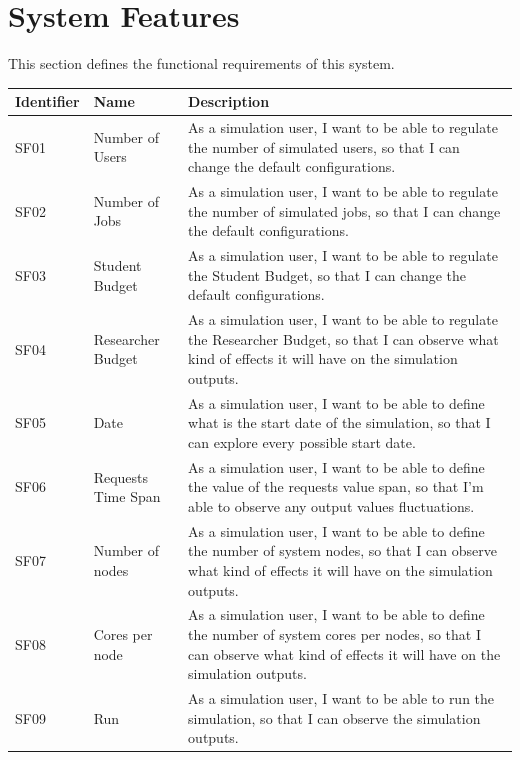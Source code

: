 \documentclass{scrreprt}
\begin{document}
\chapter{System Features}
This section defines the functional requirements of this system.
\begin{center}
    \begin{longtable}{|M{1.5cm}|M{4cm}|M{8cm}|}
        \hline
	    Identifier & Name & Description\\
        \hline
        SF01 & Number of Users & As a simulation user, I want to be able to regulate the number of simulated users, so that I can change the default configurations.  \\
        \hline
        SF02 & Number of Jobs & As a simulation user, I want to be able to regulate the number of simulated jobs, so that I can change the default configurations.  \\
        \hline
        SF03 & Student Budget & As a simulation user, I want to be able to regulate the Student Budget, so that I can change the default configurations.  \\
        \hline
        SF04 & Researcher Budget & As a simulation user, I want to be able to regulate the Researcher Budget, so that I can observe what kind of effects it will have on the simulation outputs.  \\
        \hline
        SF05 & Date & As a simulation user, I want to be able to define what is the start date of the simulation, so that I can explore every possible start date.  \\
        \hline
        SF06 & Requests Time Span & As a simulation user, I want to be able to define the value of the requests value span, so that I'm able to observe any output values fluctuations.  \\
        \hline
        SF07 & Number of nodes & As a simulation user, I want to be able to define the number of system nodes, so that I can observe what kind of effects it will have on the simulation outputs.   \\
        \hline
        SF08 & Cores per node & As a simulation user, I want to be able to define the number of system cores per nodes, so that I can observe what kind of effects it will have on the simulation outputs.   \\
        \hline
        SF09 & Run & As a simulation user, I want to be able to run the simulation, so that I can observe the simulation outputs.   \\
        \hline
    \end{longtable}
\end{center}
\end{document}
